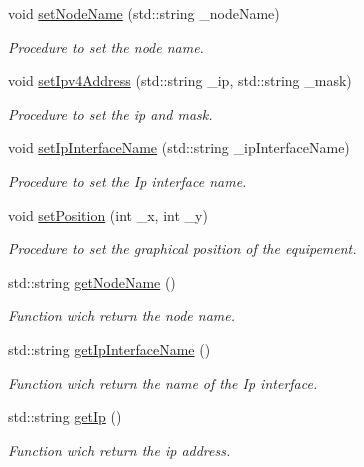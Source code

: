\begin{CompactItemize}
void \hyperlink{class_equipement_a3d502e4f5b4292e87ff33ca15801897}{setNodeName} (std::string \_\-nodeName)
\begin{CompactList}\small\item\em Procedure to set the node name. \item\end{CompactList}\item 
void \hyperlink{class_equipement_ff68b70ae1942fca75462d78194cd443}{setIpv4Address} (std::string \_\-ip, std::string \_\-mask)
\begin{CompactList}\small\item\em Procedure to set the ip and mask. \item\end{CompactList}\item 
void \hyperlink{class_equipement_cea2da7dead8d0b74c90933c422211c4}{setIpInterfaceName} (std::string \_\-ipInterfaceName)
\begin{CompactList}\small\item\em Procedure to set the Ip interface name. \item\end{CompactList}\item 
void \hyperlink{class_equipement_70bc8e8f1b9527a9c54f4ac6bd93a2c7}{setPosition} (int \_\-x, int \_\-y)
\begin{CompactList}\small\item\em Procedure to set the graphical position of the equipement. \item\end{CompactList}\item 
std::string \hyperlink{class_equipement_4ab70e59e11de8b7f8af99d06409b032}{getNodeName} ()
\begin{CompactList}\small\item\em Function wich return the node name. \item\end{CompactList}\item 
std::string \hyperlink{class_equipement_a603e0547ea7c1b7f10757226100e1cc}{getIpInterfaceName} ()
\begin{CompactList}\small\item\em Function wich return the name of the Ip interface. \item\end{CompactList}\item 
std::string \hyperlink{class_equipement_4a0b3805228532e39dcb5f83bb2d6eac}{getIp} ()
\begin{CompactList}\small\item\em Function wich return the ip address. \item\end{CompactList}\item 

\end{CompactItemize}
